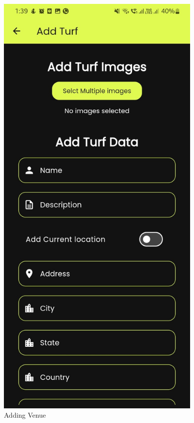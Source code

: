 \documentclass[12pt,a4paper]{report}
\begin{document}
\begin{figure}[H]
\begin{minipage}[t]{0.3\textwidth}
    \end{minipage}%
    \hfill
    \begin{minipage}[t]{0.3\textwidth}
        \centering
        \includegraphics[width=0.9\textwidth]{assets/screenshot5.jpeg}
        \caption{Adding Venue}
    \end{minipage}

\end{figure}
\end{document}
